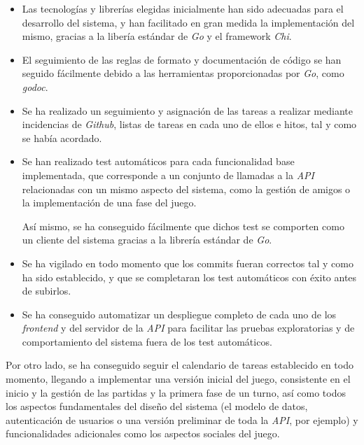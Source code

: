 \documentclass[11pt, a4paper, titlepage]{article}
\begin{document}
\begin{itemize}
    \item Las tecnologías y librerías elegidas inicialmente han sido adecuadas para el desarrollo del sistema, y han facilitado en gran medida la implementación del mismo, gracias a la libería estándar de \textit{Go} y el framework \textit{Chi}.

    \item El seguimiento de las reglas de formato y documentación de código se han seguido fácilmente debido a las herramientas proporcionadas por \textit{Go}, como \textit{godoc}.

    \item Se ha realizado un seguimiento y asignación de las tareas a realizar mediante incidencias de \textit{Github},  listas de tareas en cada uno de ellos e hitos, tal y como se había acordado.
    
    \item Se han realizado test automáticos para cada funcionalidad base implementada, que corresponde a un conjunto de llamadas a la \textit{API} relacionadas con un mismo aspecto del sistema, como la gestión de amigos o la implementación de una fase del juego.
    
    Así mismo, se ha conseguido fácilmente que dichos test se comporten como un cliente del sistema gracias a la librería estándar de \textit{Go}.
    
    \item Se ha vigilado en todo momento que los commits fueran correctos tal y como ha sido establecido, y que se completaran los test automáticos con éxito antes de subirlos.
    
    \item Se ha conseguido automatizar un despliegue completo de cada uno de los \textit{frontend} y del servidor de la \textit{API} para facilitar las pruebas exploratorias y de comportamiento del sistema fuera de los test automáticos.
\end{itemize}


Por otro lado, se ha conseguido seguir el calendario de tareas establecido en todo momento, llegando a implementar una versión inicial del juego, consistente en el inicio y la gestión de las partidas y la primera fase de un turno, así como todos los aspectos fundamentales del diseño del sistema (el modelo de datos, autenticación de usuarios o una versión preliminar de toda la \textit{API}, por ejemplo) y funcionalidades adicionales como los aspectos sociales del juego.
\end{document}
